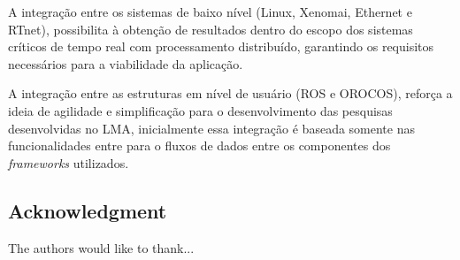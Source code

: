 \documentclass[conference]{IEEEtran}
\begin{document}
A integração entre os sistemas de baixo nível (Linux, Xenomai, Ethernet e RTnet), possibilita à obtenção de resultados dentro do escopo dos sistemas críticos de tempo real com processamento distribuído, garantindo os requisitos necessários para a viabilidade da aplicação.

A integração entre as estruturas em nível de usuário (ROS e OROCOS), reforça a ideia de agilidade e simplificação para o desenvolvimento das pesquisas desenvolvidas no LMA, inicialmente essa integração é baseada somente nas funcionalidades entre para o fluxos de dados entre os componentes dos \textit{frameworks} utilizados.		



\subsection*{Acknowledgment}\label{sec:acknowledgment}
The authors would like to thank...



\end{document}

